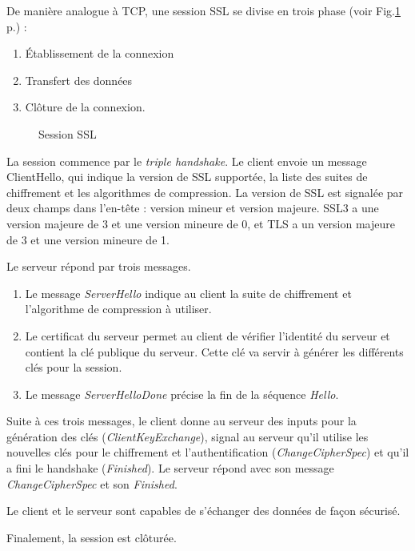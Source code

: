 De manière analogue à TCP, une session SSL se divise en trois phase (voir Fig.\ref{fig:ssl} p.\pageref{fig:ssl}) : 
\begin{enumerate}
	\item \'Etablissement de la connexion
	\item Transfert des données
	\item Clôture de la connexion.
\end{enumerate}
\begin{figure}[ht]
\centering
{}
\caption{Session SSL}
\label{fig:ssl}
\end{figure}
La session commence par le \textit{triple handshake}. 
Le client envoie un message ClientHello, qui indique la version de SSL supportée, la liste des suites de chiffrement et les algorithmes de compression. 
La version de SSL est signalée par deux champs dans l'en-tête : version mineur et version majeure. 
SSL3 a une version majeure de 3 et une version mineure de 0, et TLS a un version majeure de 3 et une version mineure de 1. 

Le serveur répond par trois messages.
\begin{enumerate}
	\item Le message \textit{ServerHello} indique au client la suite de chiffrement et l'algorithme de compression à utiliser.
	\item Le certificat du serveur permet au client de vérifier l'identité du serveur et contient la clé publique du serveur. Cette clé va servir à générer les différents clés pour la session.
	\item Le message \textit{ServerHelloDone} précise la fin de la séquence \textit{Hello}.
\end{enumerate}
Suite à ces trois messages, le client donne au serveur des inputs pour la génération des clés (\textit{ClientKeyExchange}), signal au serveur qu'il utilise les nouvelles clés pour le chiffrement et l'authentification (\textit{ChangeCipherSpec}) et qu'il a fini le handshake (\textit{Finished}).
 Le serveur répond avec son message \textit{ChangeCipherSpec} et son \textit{Finished}.
 
 Le client et le serveur sont capables de s'échanger des données de façon sécurisé. 
 
 Finalement, la session est clôturée.